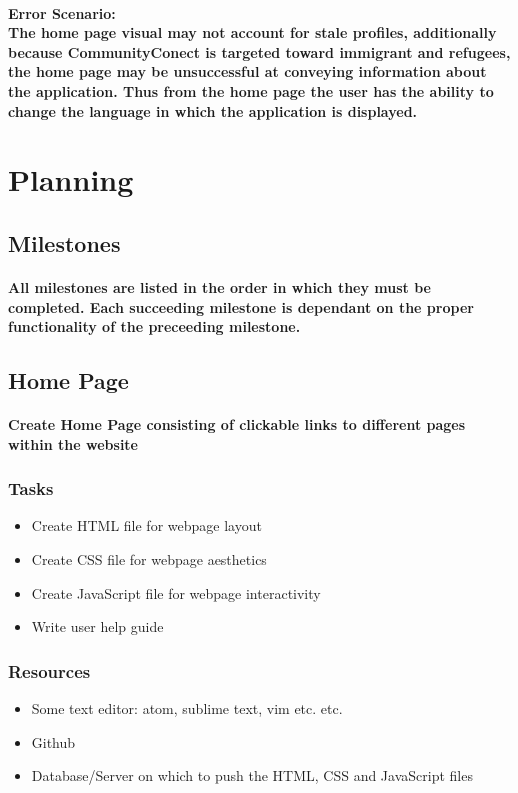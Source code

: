 \documentclass[12pt]{article}
\begin{document}
                        \paragraph{\normalfont \textbf{Error Scenario:}\\The home page visual may not account for stale profiles, additionally because CommunityConect is targeted toward immigrant and refugees, the home page may be unsuccessful at conveying information about the application. Thus from the home page the user has the ability to change the language in which the application is displayed.                   
			}

\section{\bf Planning}
	\subsection{\bf Milestones}
		\paragraph{\normalfont All milestones are listed in the order in which they must be completed. Each succeeding milestone is dependant on the proper functionality of the preceeding milestone.
		}
		\subsection{\bf Home Page}
			\paragraph{Create Home Page consisting of clickable links to different pages within the website}
			\subsubsection{\bf Tasks}
				\begin{itemize}
					\item Create HTML file for webpage layout
					\item Create CSS file for webpage aesthetics
					\item Create JavaScript file for webpage interactivity
					\item Write user help guide
				\end{itemize}
			\subsubsection{\bf Resources}
		 		\begin{itemize}
					\item Some text editor: atom, sublime text, vim etc. etc.
 					\item Github
			 		\item Database/Server on which to push the HTML, CSS and JavaScript files
				\end{itemize}
\end{document}
